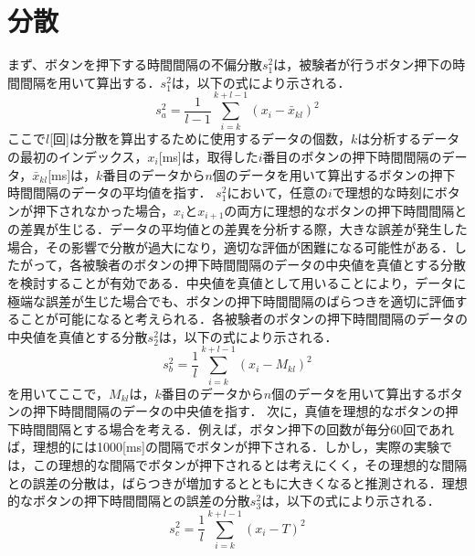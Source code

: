 \section{分散}
まず、ボタンを押下する時間間隔の不偏分散$s^2_{1}$は，被験者が行うボタン押下の時間間隔を用いて算出する．$s^2_{1}$は，以下の式により示される．
\begin{equation}
  s^2_a = \frac{1}{l-1} \sum_{i=k}^{k+l-1} (x_i - \bar{x}_{kl})^2
\end{equation}
ここで$l$[回]は分散を算出するために使用するデータの個数，$k$は分析するデータの最初のインデックス，$x_{i}$[ms]は，取得した$i$番目のボタンの押下時間間隔のデータ，$\bar{x}_{kl}$[ms]は，$k$番目のデータから$n$個のデータを用いて算出するボタンの押下時間間隔のデータの平均値を指す．
$s^2_{1}$において，任意の$i$で理想的な時刻にボタンが押下されなかった場合，$x_{i}$と$x_{i+1}$の両方に理想的なボタンの押下時間間隔との差異が生じる．データの平均値との差異を分析する際，大きな誤差が発生した場合，その影響で分散が過大になり，適切な評価が困難になる可能性がある．したがって，各被験者のボタンの押下時間間隔のデータの中央値を真値とする分散を検討することが有効である．中央値を真値として用いることにより，データに極端な誤差が生じた場合でも、ボタンの押下時間間隔のばらつきを適切に評価することが可能になると考えられる．各被験者のボタンの押下時間間隔のデータの中央値を真値とする分散$s^2_{2}$は，以下の式により示される．
\begin{equation}
  s^2_b = \frac{1}{l} \sum_{i=k}^{k+l-1} (x_i - M_{kl})^2
\end{equation}
を用いてここで，$M_{kl}$は，$k$番目のデータから$n$個のデータを用いて算出するボタンの押下時間間隔のデータの中央値を指す．
次に，真値を理想的なボタンの押下時間間隔とする場合を考える．例えば，ボタン押下の回数が毎分60回であれば，理想的には1000[ms]の間隔でボタンが押下される．しかし，実際の実験では，この理想的な間隔でボタンが押下されるとは考えにくく，その理想的な間隔との誤差の分散は，ばらつきが増加するとともに大きくなると推測される．理想的なボタンの押下時間間隔との誤差の分散$s^2_{3}$は，以下の式により示される．
\begin{equation}
  s^2_c = \frac{1}{l} \sum_{i=k}^{k+l-1} (x_i - T)^2
\end{equation}
